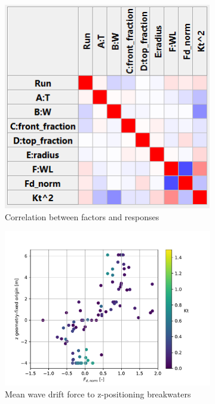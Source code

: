\begin{figure}[h]
    \centering
    \begin{subfigure}[b]{0.30\textwidth}  
        \centering 
        \includegraphics[width=\linewidth]{figures/ComFLOW/Results DI1/correlation.png}
        \caption[]%
        {{\small Correlation between factors and responses}}    
        \label{fig: correlation DI1 captive}
    \end{subfigure}
    \hfill
    \begin{subfigure}[b]{0.49\textwidth}
        \centering
        \includegraphics[width=\linewidth]{figures/ComFLOW/Results DI1/Fd_norm_VS_top_bw_with_Kt.pdf}
        \caption[]%
        {{\small Mean wave drift force to z-positioning breakwaters}}    
        \label{fig: Fd_norm_VS_top_bw_with_Kt DI1 captive H3}
    \end{subfigure}

    \caption{}
    \label{fig: }
\end{figure}    
    
